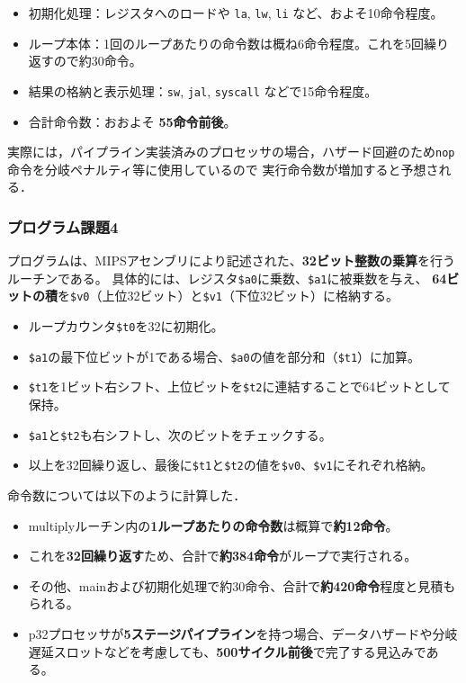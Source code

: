 \documentclass[autodetect-engine,dvi=dvipdfmx,ja=standard,
               a4j,11pt]{bxjsarticle}
\begin{document}
\begin{itemize}
  \item 初期化処理：レジスタへのロードや \texttt{la}, \texttt{lw}, \texttt{li} など、およそ10命令程度。
  \item ループ本体：1回のループあたりの命令数は概ね6命令程度。これを5回繰り返すので約30命令。
  \item 結果の格納と表示処理：\texttt{sw}, \texttt{jal}, \texttt{syscall} などで15命令程度。
  \item 合計命令数：おおよそ \textbf{55命令前後}。
\end{itemize}
実際には，パイプライン実装済みのプロセッサの場合，ハザード回避のため\verb|nop|命令を分岐ペナルティ等に使用しているので
実行命令数が増加すると予想される．
\subsubsection*{プログラム課題4}
プログラムは、MIPSアセンブリにより記述された、\textbf{32ビット整数の乗算}を行うルーチンである。
具体的には、レジスタ\verb|$a0|に乗数、\verb|$a1|に被乗数を与え、
\textbf{64ビットの積}を\verb|$v0|（上位32ビット）と\verb|$v1|（下位32ビット）に格納する。

\begin{itemize}
\item ループカウンタ\verb|$t0|を32に初期化。
\item \verb|$a1|の最下位ビットが1である場合、\verb|$a0|の値を部分和（\verb|$t1|）に加算。
\item \verb|$t1|を1ビット右シフト、上位ビットを\verb|$t2|に連結することで64ビットとして保持。
\item \verb|$a1|と\verb|$t2|も右シフトし、次のビットをチェックする。
\item 以上を32回繰り返し、最後に\verb|$t1|と\verb|$t2|の値を\verb|$v0|、\verb|$v1|にそれぞれ格納。
\end{itemize}
命令数については以下のように計算した．
\begin{itemize}
\item multiplyルーチン内の\textbf{1ループあたりの命令数}は概算で\textbf{約12命令}。
\item これを\textbf{32回繰り返す}ため、合計で\textbf{約384命令}がループで実行される。
\item その他、mainおよび初期化処理で約30命令、合計で\textbf{約420命令}程度と見積もられる。
\item p32プロセッサが\textbf{5ステージパイプライン}を持つ場合、データハザードや分岐遅延スロットなどを考慮しても、\textbf{500サイクル前後}で完了する見込みである。
\end{itemize}
\end{document}
